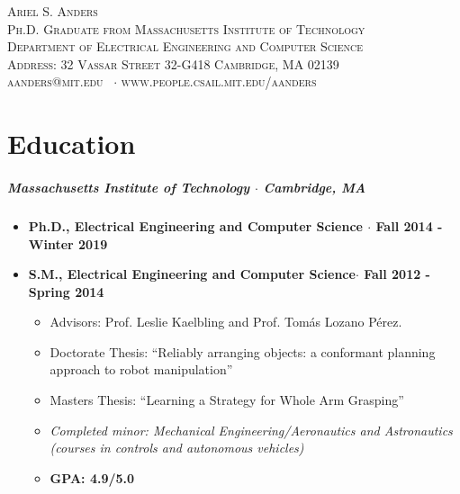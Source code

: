 \documentclass[10pt,letterpaper]{article}
\newcommand{\namestyle}{\Large \scshape}
\newcommand{\deptstyle}{\footnotesize \rmfamily \scshape}
\newcommand{\addressstyle}{\footnotesize \rmfamily \upshape}
\begin{document}
\begin{center}
\namestyle Ariel S. Anders \\[0.3em]
\deptstyle Ph.D. Graduate from  Massachusetts Institute of Technology \\Department of Electrical Engineering and Computer Science\\[0.2em]
\addressstyle Address: 32 Vassar Street 32-G418 Cambridge, MA 02139\\
    aanders@mit.edu \ $\cdot$ www.people.csail.mit.edu/aanders
\end{center}

\section*{Education}
 \subparagraph{Massachusetts Institute of Technology $\cdot$ Cambridge, MA}

\begin{itemize}
    \item {\bf Ph.D., Electrical Engineering and Computer Science $\cdot$ Fall 2014 - Winter 2019}
    \item {\bf S.M., Electrical Engineering and Computer Science$\cdot$ Fall 2012 - Spring 2014}

 	\begin{itemize}
        \item Advisors: Prof. Leslie Kaelbling and Prof. Tom\'as Lozano P\'erez.
	    \item Doctorate Thesis: ``Reliably arranging objects: a conformant planning approach to robot manipulation''
	    \item Masters Thesis: ``Learning a Strategy for Whole Arm Grasping''
        \item {\em Completed minor: Mechanical Engineering/Aeronautics and Astronautics\\
                (courses in controls and autonomous vehicles)}
        \item {\bf GPA:  4.9/5.0 }
	\end{itemize}
\end{itemize}
\end{document}
